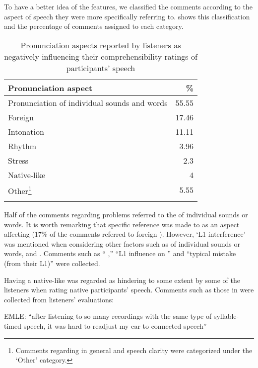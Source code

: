 \documentclass[output=paper]{langsci/langscibook}
\begin{document}
To have a better idea of the  features, we classified the comments according to the aspect of speech they were more specifically referring to.  shows this classification and the percentage of comments assigned to each  category.

\begin{table}[t]
\caption{Pronunciation aspects reported by listeners as negatively influencing their comprehensibility ratings of participants’ speech}
\label{tab:delrio:4}

\begin{tabularx}{\textwidth}{Qr}
\lsptoprule

\bfseries Pronunciation aspect & \bfseries \%\\
\midrule
Pronunciation of individual sounds and words & 55.55\\
Foreign  & 17.46\\
Intonation & 11.11\\
Rhythm & 3.96\\
Stress & 2.3\\
Native-like  & 4\\
Other\footnote{Comments regarding  in general and speech clarity were categorized under the ‘Other’ category.} & 5.55\\
\lspbottomrule
\end{tabularx}
\end{table}

Half of the comments regarding  problems referred to the  of individual sounds or words. It is worth remarking that specific reference was made to  as an aspect affecting  (17\% of the comments referred to foreign ). However, ‘L1 interference’ was mentioned when considering other  factors such as  of individual sounds or words, and . Comments such as “ ,” “L1 influence on ” and “typical  mistake (from their L1)” were collected.

Having a native-like  was regarded as hindering  to some extent by some of the listeners when rating native participants’ speech. Comments such as those in  were collected from listeners’ evaluations: 

\ea\label{ex:delrio:1}
EMLE: “after listening to so many recordings with the same type of syllable-timed speech, it was hard to readjust my ear to connected speech”~
\z
\end{document}
